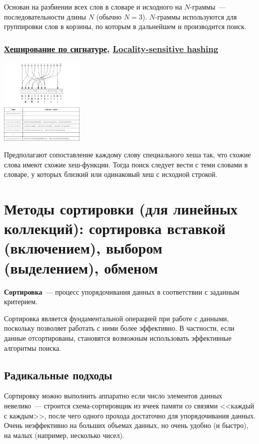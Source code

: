 Основан на разбиении всех слов в словаре и исходного на \(N\)-граммы~--- последовательности длины \(N\) (обычно \(N = 3\)).
\(N\)-граммы используются для группировки слов в корзины, по которым в дальнейшем и производится поиск.

\subsubsection{\href{https://cs.msu.ru/sites/cmc/files/docs/boycov.pdf}{Хеширование по сигнатуре}, \href{https://en.wikipedia.org/wiki/Locality-sensitive_hashing\#Bit_sampling_for_Hamming_distance}{Locality-sensitive hashing}}

\begin{center}
  \includegraphics[width=0.3\textwidth]{resources/19-26/hash.png}
\end{center}
Предполагают сопоставление каждому слову специального хеша так, что схожие слова имеют схожие хеш-функции. Тогда поиск следует вести с
теми словами в словаре, у которых близкий или одинаковый хеш с исходной строкой.


\section{Методы сортировки (для линейных коллекций): сортировка вставкой (включением), выбором (выделением), обменом}
\textbf{Сортировка}~--- процесс упорядочивания данных в соответствии с заданным критерием.

Сортировка является фундаментальной операцией при работе с данными, поскольку позволяет работать с ними более
эффективно. В частности, если данные отсортированы, становятся возможным использовать эффективные алгоритмы поиска.

\subsection{Радикальные подходы}
Сортировку можно выполнить аппаратно если число элементов данных невелико~--- строится схема-сортировщик из ячеек памяти
со связями <<каждый с каждым>>, после чего одного прохода достаточно для упорядочивания данных. Очень
неэффективно на больших объемах данных, но очень удобно (и быстро), на малых (например, несколько чисел).

